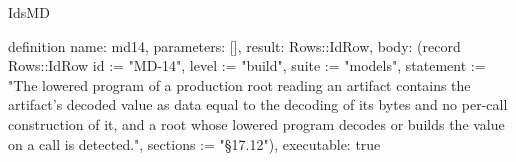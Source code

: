 \begin{lexlean}{IdsMD}
\begin{semanticmodule}
definition{
  name: md14,
  parameters: [],
  result: Rows::IdRow,
  body: (record Rows::IdRow {id := "MD-14", level := "build", suite := "models", statement := "The lowered program of a production root reading an artifact contains the artifact's decoded value as data equal to the decoding of its bytes and no per-call construction of it, and a root whose lowered program decodes or builds the value on a call is detected.", sections := "§17.12"}),
  executable: true
}
\end{semanticmodule}
\end{lexlean}
